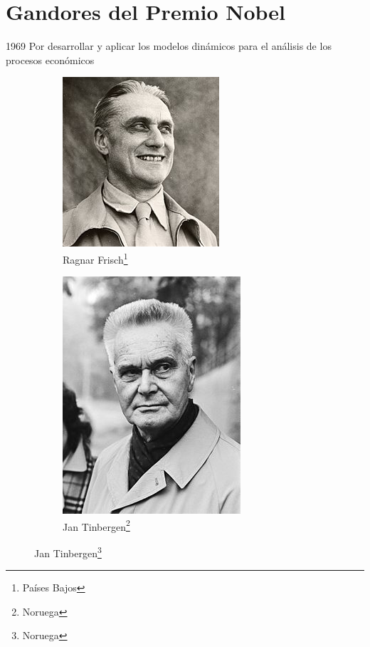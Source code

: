 \documentclass[aspectratio=169]{beamer}
\begin{document}
    \section{Gandores del Premio Nobel}
        \begin{frame}[t]{1969}
            \justify
            Por desarrollar y aplicar los modelos dinámicos para el análisis de los procesos económicos
            \begin{figure}[ht]
                \centering
                \caption{Ganadores del Premio Nobel de Economía en 1969}
                \begin{subfigure}[b]{0.49\textwidth}
                    \centering
                    \includegraphics[scale = 0.4]{Img/RagnarFrisch.jpg}
                    \caption{Ragnar Frisch\footnote{Países Bajos}}
                    \label{fig: RagnarFrisch}
                \end{subfigure}
                \hfill 
                \begin{subfigure}[b]{0.49\textwidth}
                    \centering
                    \includegraphics[scale = 0.3]{Img/JanTinbergen.jpg}
                    \caption{Jan Tinbergen\footnote{Noruega}}
                    \label{fig: JanTinbergen}
                \end{subfigure}
                \label{fig: Ganadores1969}
            \end{figure}
        \end{frame}
\end{document}
